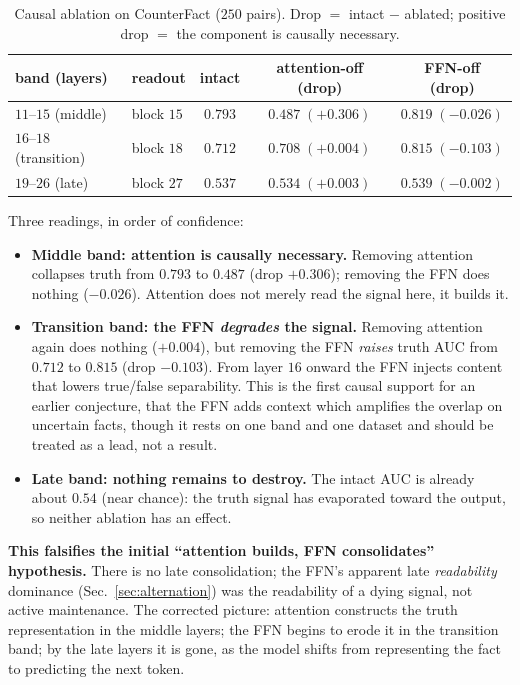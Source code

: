 \documentclass[11pt]{article}
\begin{document}
\begin{table}[h]
\centering
\caption{Causal ablation on CounterFact ($250$ pairs). Drop $=$ intact $-$
ablated; positive drop $=$ the component is causally necessary.}
\label{tab:abl}
\begin{tabular}{llccc}
\toprule
band (layers) & readout & intact & attention-off (drop) & FFN-off (drop) \\
\midrule
$11$--$15$ (middle)     & block $15$ & $0.793$ & $0.487\;(+0.306)$ & $0.819\;(-0.026)$ \\
$16$--$18$ (transition) & block $18$ & $0.712$ & $0.708\;(+0.004)$ & $0.815\;(-0.103)$ \\
$19$--$26$ (late)       & block $27$ & $0.537$ & $0.534\;(+0.003)$ & $0.539\;(-0.002)$ \\
\bottomrule
\end{tabular}
\end{table}

Three readings, in order of confidence:
\begin{itemize}
\item \textbf{Middle band: attention is causally necessary.} Removing
attention collapses truth from $0.793$ to $0.487$ (drop $+0.306$); removing
the FFN does nothing ($-0.026$). Attention does not merely read the signal
here, it builds it.
\item \textbf{Transition band: the FFN \emph{degrades} the signal.} Removing
attention again does nothing ($+0.004$), but removing the FFN \emph{raises}
truth AUC from $0.712$ to $0.815$ (drop $-0.103$). From layer $16$ onward the
FFN injects content that lowers true/false separability. This is the first
causal support for an earlier conjecture, that the FFN adds context which
amplifies the overlap on uncertain facts, though it rests on one band and one
dataset and should be treated as a lead, not a result.
\item \textbf{Late band: nothing remains to destroy.} The intact AUC is
already about $0.54$ (near chance): the truth signal has evaporated toward
the output, so neither ablation has an effect.
\end{itemize}

\textbf{This falsifies the initial ``attention builds, FFN consolidates''
hypothesis.} There is no late consolidation; the FFN's apparent late
\emph{readability} dominance (Sec.~\ref{sec:alternation}) was the readability
of a dying signal, not active maintenance. The corrected picture: attention
constructs the truth representation in the middle layers; the FFN begins to
erode it in the transition band; by the late layers it is gone, as the model
shifts from representing the fact to predicting the next token.
\end{document}
